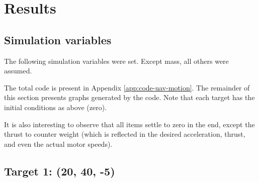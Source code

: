 \section{Results}
\label{sec:results}

\subsection{Simulation variables}
The following simulation variables were set. Except mass, all others were assumed.



The total code is present in Appendix \ref{app:code-uav-motion}. The remainder of this section presents graphs generated by the code. Note that each target has the initial conditions as above (zero).

It is also interesting to observe that all items settle to zero in the end, except the thrust to counter weight (which is reflected in the desired acceleration, thrust, and even the actual motor speeds).

\pagebreak
\subsection{Target 1: (20, 40, -5)}

